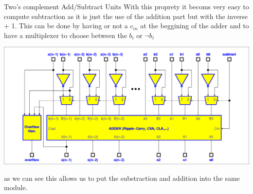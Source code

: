 \begin{parag}{Two's complement Add/Subtract Units}
    With this proprety it becoms very easy to compute subtraction as it is just the use of the addition part but with the inverse + 1. This can be done by having or not a $c_{in}$ at the beggining of the adder and to have a multiplexer to choose between the $b_i$ or $\neg b_i$
	\begin{center}
	\includegraphics[scale=0.2]{screenshots/2025-10-21_3.png}
	\end{center}
	as we can see this allows us to put the substraction and addition into the same module.
\end{parag}







